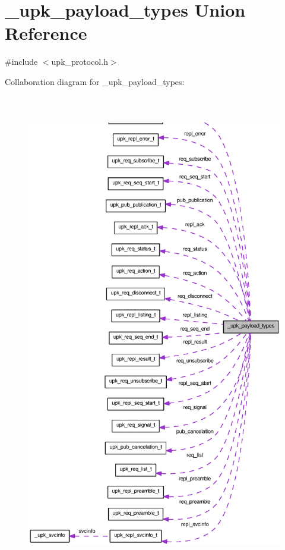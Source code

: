 \section{\_\-upk\_\-payload\_\-types Union Reference}
\label{union__upk__payload__types}


{\ttfamily \#include $<$upk\_\-protocol.h$>$}



Collaboration diagram for \_\-upk\_\-payload\_\-types:
\nopagebreak
\begin{figure}[H]
\begin{center}
\leavevmode
\includegraphics[height=600pt]{union__upk__payload__types__coll__graph}
\end{center}
\end{figure}
